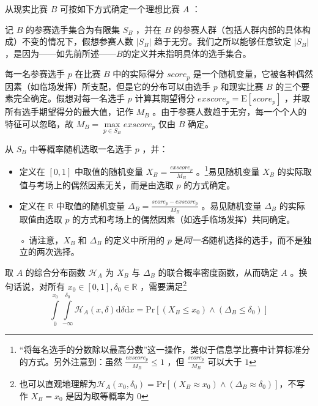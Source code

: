             \begin{definition}
                从现实比赛 $B$ 可按如下方式确定一个理想比赛 $A$ ：

                \begin{asparaenum}[\bfseries{步骤} 1.]
                    \item 记 $B$ 的参赛选手集合为有限集 $S_B$ ，并在 $B$ 的参赛人群（包括人群内部的具体构成）不变的情况下，假想参赛人数 $\left|S_B\right|$ 趋于无穷。我们之所以能够任意钦定 $\left|S_B\right|$ ，是因为——如先前所述——$B$的定义并未指明具体的选手集合。
                    \item \label{step:realToIdealStep2} 每一名参赛选手 $p$ 在比赛 $B$ 中的实际得分 $\textit{score}_p$ 是一个随机变量，它被各种偶然因素（如临场发挥）所支配，但是它的分布可以由选手 $p$ 和现实比赛 $B$ 的三个要素完全确定。假想对每一名选手 $p$ 计算其期望得分 $\textit{exscore}_p=\mathrm{E}\left[\textit{score}_p\right]$ ，并取所有选手期望得分的最大值，记作 $M_B$ 。由于参赛人数趋于无穷，每一个个人的特征可以忽略，故 $M_B=\max\limits_{p\in S_B} \textit{exscore}_p$ 仅由 $B$ 确定。
                    \item \label{step:realToIdealStep3} 从 $S_B$ 中等概率随机选取一名选手 $p$ ，并：
                    \begin{itemize}[leftmargin=4em]
                        \item 定义在 $[0,1]$ 中取值的随机变量 $X_B=\frac{\textit{exscore}_p}{M_B}$ 。\footnote{“将每名选手的分数除以最高分数”这一操作，类似于信息学比赛中计算标准分的方式。另外注意到：虽然 $\frac{\textit{exscore}_p}{M_B}\leq 1$ ，但 $\frac{\textit{score}_p}{M_B}$ 可以大于 $1$ }易见随机变量 $X_B$ 的实际取值与考场上的偶然因素无关，而是由选取 $p$ 的方式确定。
                        \item 定义在 $\mathbb{R}$ 中取值的随机变量 $\Delta_B=\frac{\textit{score}_p-\textit{exscore}_p}{M_B}$ 。易见随机变量 $\Delta_B$ 的实际取值由选取 $p$ 的方式和考场上的偶然因素（如选手临场发挥）共同确定。
                        \item [◦] 请注意，$X_B$ 和 $\Delta_B$ 的定义中所用的 $p$ 是\emph{同一名}随机选择的选手，而不是独立的两次选择。
                    \end{itemize}
                    \item 取 $A$ 的综合分布函数 $\mathcal{H}_A$ 为 $X_B$ 与 $\Delta_B$ 的联合概率密度函数，从而确定 $A$ 。换句话说，对所有 $x_0\in[0,1],\delta_0\in\mathbb{R}$ ，需要满足\footnote{也可以直观地理解为$\mathcal{H}_A(x_0,\delta_0)=\mathrm{Pr}\left[\left(X_B\approx x_0\right)\land\left(\Delta_B\approx\delta_0\right)\right]$，不写作 $X_B=x_0$ 是因为取等概率为 $0$ }
                    \begin{equation}
                        \int\limits_0^{x_0}\int\limits_{-\infty}^{\delta_0} \mathcal{H}_A(x,\delta)\mathrm{d}\delta\mathrm{d}x=\mathrm{Pr}\left[\left(X_B\leq x_0\right)\land\left(\Delta_B\leq\delta_0\right)\right]
                        \label{formula:definitionOfJointDensityFunction}
                    \end{equation}


\end{asparaenum}
\end{definition}
